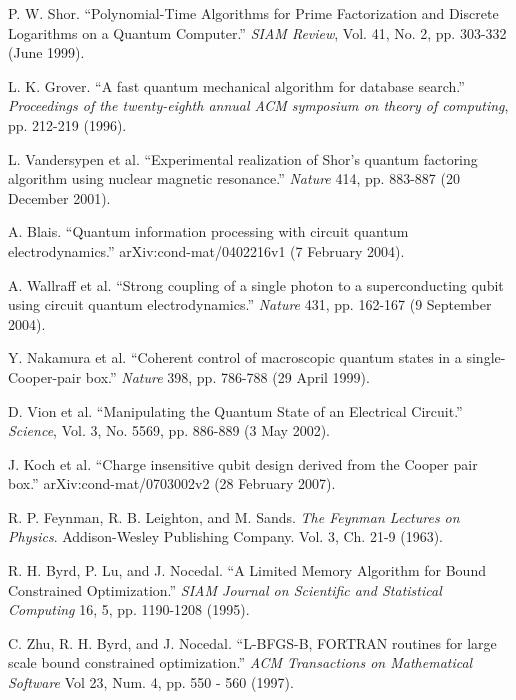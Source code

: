 \documentclass[twocolumn]{revtex4}
\begin{document}
\begin{thebibliography}{9}
 P. W. Shor. ``Polynomial-Time Algorithms for Prime
  Factorization and Discrete Logarithms on a Quantum Computer.''
  \textit{SIAM Review}, Vol. 41, No. 2, pp. 303-332 (June 1999).

 L. K. Grover. ``A fast quantum mechanical algorithm
  for database search.'' \textit{Proceedings of the twenty-eighth
    annual ACM symposium on theory of computing}, pp. 212-219 (1996).

 L. Vandersypen et al. ``Experimental realization
  of Shor's quantum factoring algorithm using nuclear magnetic
  resonance.'' \textit{Nature} 414, pp. 883-887 (20 December 2001).

 A. Blais. ``Quantum information processing with
  circuit quantum electrodynamics.'' arXiv:cond-mat/0402216v1 (7
  February 2004).

 A. Wallraff et al. ``Strong coupling of a single
  photon to a superconducting qubit using circuit quantum
  electrodynamics.'' \textit{Nature} 431, pp. 162-167 (9 September
  2004).

 Y. Nakamura et al. ``Coherent control of
  macroscopic quantum states in a single-Cooper-pair box.''
  \textit{Nature} 398, pp. 786-788 (29 April 1999).

 D. Vion et al. ``Manipulating the Quantum State of an
  Electrical Circuit.'' \textit{Science}, Vol. 3, No. 5569,
  pp. 886-889 (3 May 2002).
  
 J. Koch et al. ``Charge insensitive qubit design
  derived from the Cooper pair box.'' arXiv:cond-mat/0703002v2 (28
  February 2007).

 R. P. Feynman, R. B. Leighton, and
  M. Sands. \textit{The Feynman Lectures on Physics}. Addison-Wesley
  Publishing Company. Vol. 3, Ch. 21-9 (1963).

 R. H. Byrd, P. Lu, and J. Nocedal. ``A Limited Memory
  Algorithm for Bound Constrained Optimization.'' \textit{SIAM Journal
    on Scientific and Statistical Computing} 16, 5,
  pp. 1190-1208 (1995).
  
 C. Zhu, R. H. Byrd, and J. Nocedal. ``L-BFGS-B, FORTRAN
  routines for large scale bound constrained optimization.''
  \textit{ACM Transactions on Mathematical Software} Vol 23, Num. 4,
  pp. 550 - 560 (1997).

\end{thebibliography}
\end{document}
